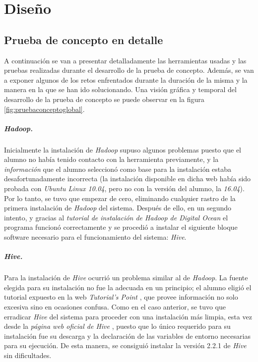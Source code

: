 \chapter{Diseño} 
\label{e.disenyo}
\section{Prueba de concepto en detalle} 
\label{e.disenyo.pruebaconcepto}
A continuación se van a presentar detalladamente las herramientas usadas y las pruebas realizadas durante el desarrollo de la prueba de concepto. Además, se van a exponer algunos de los retos enfrentados durante la duración de la misma y la manera en la que se han ido solucionando. Una visión gráfica y temporal del desarrollo de la prueba de concepto se puede observar en la figura \ref{fig:pruebaconceptoglobal}. 

\par
\paragraph*{Hadoop.}

\par
Inicialmente la instalación de \textit{Hadoop} supuso algunos problemas puesto que el alumno no había tenido contacto con la herramienta previamente, y la \textit{información} \cite{hadoop_installation_bad} que el alumno seleccionó como base para la instalación estaba desafortunadamente incorrecta (la instalación disponible en dicha web había sido probada con \textit{Ubuntu Linux 10.04}, pero no con la versión del alumno, la \textit{16.04}). Por lo tanto, se tuvo que empezar de cero, eliminando cualquier rastro de la primera instalación de \textit{Hadoop} del sistema. Después de ello, en un segundo intento, y gracias al \textit{tutorial de instalación de Hadoop de Digital Ocean} \cite{hadoop_installation} el programa funcionó correctamente y se procedió a instalar el siguiente bloque software necesario para el funcionamiento del sistema: \textit{Hive}.


\par
\paragraph*{Hive.}

\par
Para la instalación de \textit{Hive} ocurrió un problema similar al de \textit{Hadoop}. La fuente elegida para su instalación no fue la adecuada en un principio; el alumno eligió el tutorial expuesto en la web \textit{Tutorial's Point} \cite{hivetutorialspoint}, que provee información no solo excesiva sino en ocasiones confusa. Como en el caso anterior, se tuvo que erradicar \textit{Hive} del sistema para proceder con una instalación más limpia, esta vez desde la \textit{página web oficial de Hive} \cite{hive_installation}, puesto que lo único requerido para su instalación fue su descarga y la declaración de las variables de entorno necesarias para su ejecución. De esta manera, se consiguió instalar la versión 2.2.1 de \textit{Hive} sin dificultades. 


